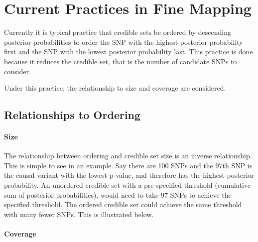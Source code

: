 \section{Current Practices in Fine Mapping}
Currently it is typical practice that credible sets be ordered by descending posterior probabilities to order the SNP with the highest posterior probability first and the SNP with the lowest posterior probability last. This practice is done because it reduces the credible set, that is the number of candidate SNPs to consider. 

Under this practice, the relationship to size and coverage are considered. 

\subsection{Relationships to Ordering}
\paragraph{Size}
The relationship between ordering and credible set size is an inverse relationship. This is simple to see in an example. Say there are 100 SNPs and the 97th SNP is the causal variant with the lowest p-value, and therefore has the highest posterior probability. An unordered credible set with a pre-specified threshold (cumulative sum of posterior probabilities), would need to take 97 SNPs to achieve the specified threshold. The ordered credible set could achieve the same threshold with many fewer SNPs. This is illustrated below.
\paragraph{Coverage}